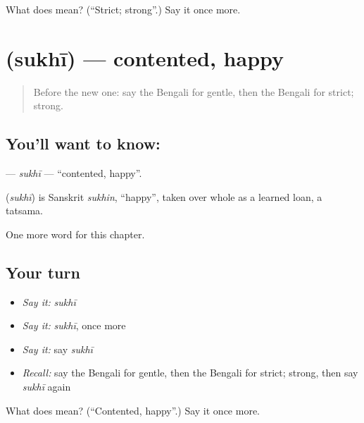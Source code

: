 \begin{tcolorbox}[breakable,colback=teal!4,colframe=teal!35!black,title={Before you move on}]
What does  mean? (\textquotedblleft{}Strict; strong\textquotedblright{}.) Say it once more.
\end{tcolorbox}
\section[\texorpdfstring{\bn{সুখী} (sukhī)}{সুখী (sukhī)}]{ (sukhī) — contented, happy}

\label{lesson:BN-C161-sukhi}



\begin{quote}
Before the new one: say the Bengali for gentle, then the Bengali for strict; strong.
\end{quote}

\subsection*{You'll want to know: }
\textbf{} — \emph{sukhī} — \textquotedblleft{}contented, happy\textquotedblright{}.

\begin{cousinweb}
\textbf{} (\emph{sukhī}) is Sanskrit \emph{sukhin}, \textquotedblleft{}happy\textquotedblright{}, taken over whole as a learned loan, a tatsama.
\end{cousinweb}

\begin{grammarlens}[title={What you've built}]
One more word for this chapter.
\end{grammarlens}

\subsection*{Your turn}
\begin{itemize}
\raggedright
  \item \emph{Say it:} \emph{sukhī}
  \item \emph{Say it:} \emph{sukhī}, once more
  \item \emph{Say it:} say \emph{sukhī}
  \item \emph{Recall:} say the Bengali for gentle, then the Bengali for strict; strong, then say \emph{sukhī} again
\end{itemize}

\begin{tcolorbox}[breakable,colback=teal!4,colframe=teal!35!black,title={Before you move on}]
What does  mean? (\textquotedblleft{}Contented, happy\textquotedblright{}.) Say it once more.
\end{tcolorbox}
